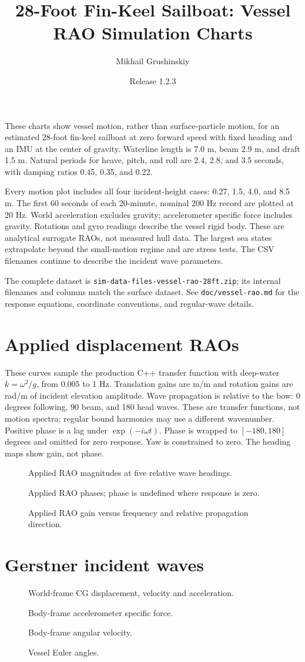 \documentclass[11pt,letterpaper]{article}
\title{28-Foot Fin-Keel Sailboat: Vessel RAO Simulation Charts}
\author{Mikhail Grushinskiy}
\date{Release 1.2.3}
\newcommand{\VesselChart}[2]{
  \begin{figure}[H]\centering
  \resizebox{\textwidth}{!}{}
  \caption{#2}
  \end{figure}\clearpage
}
\begin{document}
\maketitle
These charts show vessel motion, rather than surface-particle motion, for an
estimated 28-foot fin-keel sailboat at zero forward speed with fixed heading
and an IMU at the center of gravity. Waterline length is 7.0 m, beam 2.9 m,
and draft 1.5 m. Natural periods for heave, pitch, and roll are 2.4, 2.8,
and 3.5 seconds, with damping ratios 0.45, 0.35, and 0.22.

Every motion plot includes all four incident-height cases: 0.27, 1.5, 4.0, and 8.5 m.
The first 60 seconds of each 20-minute, nominal 200 Hz record are plotted at
20 Hz. World acceleration excludes gravity; accelerometer specific force
includes gravity. Rotations and gyro readings describe the vessel rigid body.
These are analytical surrogate RAOs, not measured hull data. The largest sea
states extrapolate beyond the small-motion regime and are stress tests.
The CSV filenames continue to describe the incident wave parameters.

The complete dataset is \texttt{sim-data-files-vessel-rao-28ft.zip}; its internal
filenames and columns match the surface dataset. See \texttt{doc/vessel-rao.md}
for the response equations, coordinate conventions, and regular-wave details.
\clearpage
\section{Applied displacement RAOs}
These curves sample the production C++ transfer function with deep-water
$k=\omega^2/g$, from 0.005 to 1 Hz. Translation gains are m/m and rotation
gains are rad/m of incident elevation amplitude. Wave propagation is relative
to the bow: 0 degrees following, 90 beam, and 180 head waves. These are
transfer functions, not motion spectra; regular bound harmonics may use a
different wavenumber. Positive phase is a lag under $\exp(-i\omega t)$.
Phase is wrapped to $[-180,180]$ degrees and omitted for zero response.
Yaw is constrained to zero. The heading maps show gain, not phase.
\VesselChart{response_gain}{Applied RAO magnitudes at five relative wave headings.}
\VesselChart{response_phase}{Applied RAO phases; phase is undefined where response is zero.}
\VesselChart{response_heading}{Applied RAO gain versus frequency and relative propagation direction.}
\section{Gerstner incident waves}
\VesselChart{gerstner_worldframe}{World-frame CG displacement, velocity and acceleration.}
\VesselChart{gerstner_imu_acc}{Body-frame accelerometer specific force.}
\VesselChart{gerstner_imu_gyro}{Body-frame angular velocity.}
\VesselChart{gerstner_euler}{Vessel Euler angles.}
\end{document}
